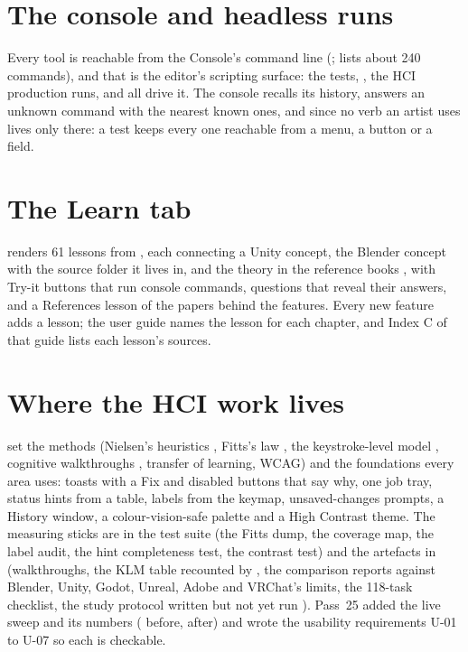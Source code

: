 \section{The console and headless runs}
Every tool is reachable from the Console's command line (;  lists about 240
commands), and that is the editor's scripting surface: the tests, , the HCI
production runs,  and  all drive it. The console recalls its
history, answers an unknown command with the nearest known ones, and since  no verb an artist uses lives only
there: a test keeps every one reachable from a menu, a button or a field.

\section{The Learn tab}
 renders 61 lessons from , each connecting a Unity concept, the Blender
concept with the source folder it lives in, and the theory in the reference books \cite{MarschnerShirley2021,
Gregory2018vol1, Gregory2018vol2}, with Try-it buttons that run console commands, questions that reveal their
answers, and a References lesson of the papers behind the features. Every new feature adds a lesson; the user guide
names the lesson for each chapter, and Index C of that guide lists each lesson's sources.

\section{Where the HCI work lives}
 set the methods (Nielsen's heuristics \cite{Nielsen1994Enhancing, Nielsen1993}, Fitts's law
\cite{Fitts1954Information}, the keystroke-level model \cite{Card1980Keystroke, Card1983}, cognitive walkthroughs
\cite{Polson1992Cognitive}, transfer of learning, WCAG) and the foundations every area uses: toasts with a Fix and
disabled buttons that say why, one job tray, status hints from a table, labels from the keymap, unsaved-changes
prompts, a History window, a colour-vision-safe palette and a High Contrast theme. The measuring sticks are in the
test suite (the Fitts dump, the coverage map, the label audit, the hint completeness test, the contrast test) and the
artefacts in  (walkthroughs, the KLM table recounted by , the comparison reports
against Blender, Unity, Godot, Unreal, Adobe and VRChat's limits, the 118-task checklist, the study protocol written
but not yet run \cite{Brooke1996Sus}). Pass~25 added the live sweep and its numbers (
before,  after) and wrote the usability requirements U-01 to U-07 so each is checkable.

